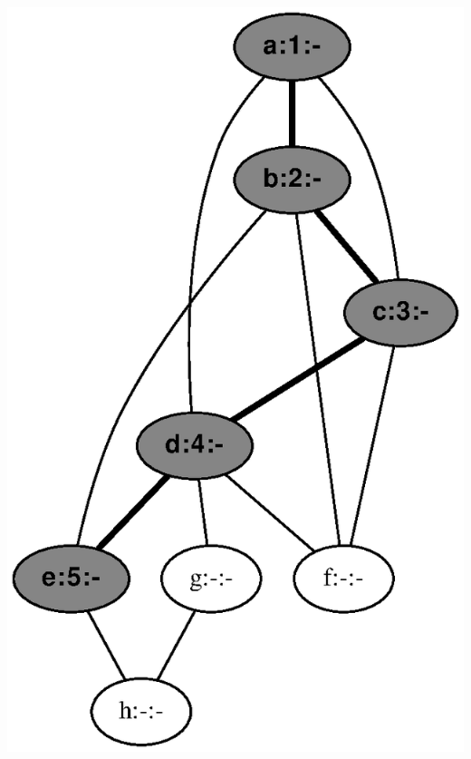 \documentclass{article}
\begin{document}
\includegraphics[height=.3\textheight]{dfs_undirected_classroom_05.eps}
\vspace{1em}
\end{document}
